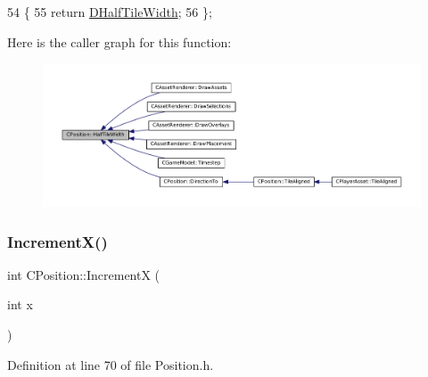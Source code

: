 \begin{DoxyCode}
54                                   \{
55             \textcolor{keywordflow}{return} \hyperlink{classCPosition_a3227e835d9008346e9d91bdad2380f14}{DHalfTileWidth};  
56         \};
\end{DoxyCode}
Here is the caller graph for this function\+:\nopagebreak
\begin{figure}[H]
\begin{center}
\leavevmode
\includegraphics[width=350pt]{classCPosition_a4b799a0fb78ddd8bbd8548980e2458af_icgraph}
\end{center}
\end{figure}
\hypertarget{classCPosition_aa5955d67d5ab7ca74d80cb7303b6eaa9}{}\label{classCPosition_aa5955d67d5ab7ca74d80cb7303b6eaa9} 
\subsubsection{\texorpdfstring{Increment\+X()}{IncrementX()}}
{\footnotesize\ttfamily int C\+Position\+::\+IncrementX (\begin{DoxyParamCaption}\item[{int}]{x }\end{DoxyParamCaption})\hspace{0.3cm}{\ttfamily [inline]}}



Definition at line 70 of file Position.\+h.


